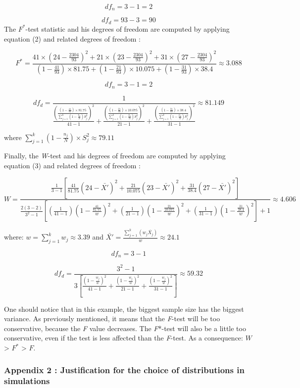 \documentclass[
]{article}
\begin{document}
\[
df_n=3-1=2
\]

\[
df_d=93-3=90
\] The \(F^*\)-test statistic and his degrees of freedom are computed by
applying equation (2) and related degrees of freedom :

\[
F^*=\frac{41\times(24-\frac{2304}{93})^2+21\times(23-\frac{2304}{93})^2+31\times(27-\frac{2304}{93})^2}{(1-\frac{41}{93})\times81.75+(1-\frac{21}{93})\times10.075+(1-\frac{31}{93})\times38.4} \approx 3.088
\]

\[
df_n=3-1=2
\]

\[
df_d=\frac{1}{\frac{(\frac{(1-\frac{41}{93})\times81.75}{\sum_{j=1}^k(1-\frac{n_j}{N})S_j^2})^2}{41-1}+\frac{(\frac{(1-\frac{21}{93})\times10.075}{\sum_{j=1}^k(1-\frac{n_j}{N})S_j^2})^2}{21-1}+\frac{(\frac{(1-\frac{31}{93})\times38.4}{\sum_{j=1}^k(1-\frac{n_j}{N})S_j^2})^2}{31-1}} \approx 81.149
\]

where \(\sum_{j=1}^k(1-\frac{n_j}{N})\times S_j^2 \approx 79.11\)

Finally, the \emph{W}-test and his degrees of freedom are computed by
applying equation (3) and related degrees of freedom :

\[
W=\frac{\frac{1}{3-1}[\frac{41}{81.75}(24-\bar{X'})^2+\frac{21}{10.075}(23-\bar{X'})^2+\frac{31}{38.4}(27-\bar{X'})^2]}
{\frac{2(3-2)}{3^2-1}[(\frac{1}{41-1})(1-\frac{\frac{41}{81.75}}{w})^2+(\frac{1}{21-1})(1-\frac{\frac{21}{10.075}}{w})^2+(\frac{1}{31-1})(1-\frac{\frac{31}{38.4}}{w})^2]+1} \approx 4.606
\]

where: \(w=\sum_{j=1}^k w_j \approx 3.39\) and
\(\bar{X'}=\frac{\sum_{j=1}^k (w_j\bar{X_j})}{w} \approx 24.1\)

\[
df_n=3-1
\]

\[
df_d=\frac{3^2-1}{3[\frac{(1-\frac{w_j}{w})^2}{41-1}+\frac{(1-\frac{w_j}{w})^2}{21-1}+\frac{(1-\frac{w_j}{w})^2}{31-1}]} \approx 59.32
\]

One should notice that in this example, the biggest sample size has the
biggest variance. As previously mentioned, it means that the
\emph{F}-test will be too conservative, because the \emph{F} value
decreases. The \emph{F}*-test will also be a little too conservative,
even if the test is less affected than the \emph{F}-test. As a
consequence: \(W\) \textgreater{} \(F^*\) \textgreater{} \(F\).

\hypertarget{appendix-2-justification-for-the-choice-of-distributions-in-simulations}{%
\subsubsection{Appendix 2 : Justification for the choice of
distributions in
simulations}\label{appendix-2-justification-for-the-choice-of-distributions-in-simulations}}
\end{document}
